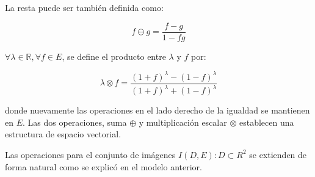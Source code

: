 La resta puede ser tambi\'en definida como:

\begin{equation}
	f\ominus g=\frac{f-g}{1-fg}
\end{equation}

$\forall \lambda \in \mathbb{R}, \forall f \in E $, se define el producto entre $\lambda$ y $f$ por:
 
\begin{equation}
	\lambda \otimes f =\frac{(1+f)^\lambda-(1-f)^\lambda}{(1+f)^\lambda+(1-f)^\lambda}
\end{equation}

donde nuevamente las operaciones en el lado derecho de la igualdad se mantienen en $E$. Las dos operaciones, suma $\oplus$ y multiplicación escalar $\otimes$ establecen una estructura de espacio vectorial.

Las operaciones para el conjunto de im\'agenes $I(D,E):D\subset R^2$ se extienden de forma natural como se explic\'o en el modelo anterior.  